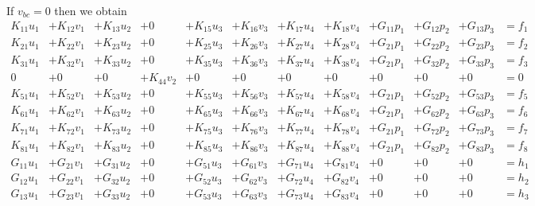 If $v_{bc}=0$ then we obtain
{\small
\[
\begin{array}{lllllllllllll}
K_{11} u_1 &+ K_{12} v_1 &+ K_{13} u_2 &+ 0 &+ K_{15} u_3 &+ K_{16} v_3 &+ K_{17}u_4  &+ K_{18}v_4  
&+ G_{11}p_1 &+ G_{12} p_2 &+ G_{13} p_3 & =  f_1 \\
K_{21} u_1 &+ K_{22} v_1 &+ K_{23} u_2 &+ 0 &+ K_{25} u_3 &+ K_{26} v_3 &+ K_{27}u_4  &+ K_{28}v_4  
&+ G_{21}p_1 &+ G_{22} p_2 &+ G_{23} p_3 & =  f_2 \\
K_{31} u_1 &+ K_{32} v_1 &+ K_{33} u_2 &+ 0 &+ K_{35} u_3 &+ K_{36} v_3 &+ K_{37}u_4  &+ K_{38}v_4  
&+ G_{21}p_1 &+ G_{32} p_2 &+ G_{33} p_3 & =  f_3 \\
0  &+ 0  &+ 0  &+ K_{44} v_2 &+ 0 &+ 0 &+ 0  &+ 0  
&+ 0 &+ 0 &+ 0 & =  0 \\
K_{51} u_1 &+ K_{52} v_1 &+ K_{53} u_2 &+ 0 &+ K_{55} u_3 &+ K_{56} v_3 &+ K_{57}u_4  &+ K_{58}v_4  
&+ G_{21}p_1 &+ G_{52} p_2 &+ G_{53} p_3 & =  f_5 \\
K_{61} u_1 &+ K_{62} v_1 &+ K_{63} u_2 &+ 0 &+ K_{65} u_3 &+ K_{66} v_3 &+ K_{67}u_4  &+ K_{68}v_4  
&+ G_{21}p_1 &+ G_{62} p_2 &+ G_{63} p_3 & =  f_6 \\
K_{71} u_1 &+ K_{72} v_1 &+ K_{73} u_2 &+ 0 &+ K_{75} u_3 &+ K_{76} v_3 &+ K_{77}u_4  &+ K_{78}v_4  
&+ G_{21}p_1 &+ G_{72} p_2 &+ G_{73} p_3 & =  f_7 \\
K_{81} u_1 &+ K_{82} v_1 &+ K_{83} u_2 &+ 0 &+ K_{85} u_3 &+ K_{86} v_3 &+ K_{87}u_4  &+ K_{88}v_4  
&+ G_{21}p_1 &+ G_{82} p_2 &+ G_{83} p_3 & =  f_8 \\
G_{11}u_1 &+ G_{21}v_1 &+ G_{31}u_2 &+ 0 &+ G_{51}u_3 &+ G_{61}v_3 &+ G_{71}u_4 &+ G_{81}v_4 &+0&+0&+0&= h_1 \\
G_{12}u_1 &+ G_{22}v_1 &+ G_{32}u_2 &+ 0 &+ G_{52}u_3 &+ G_{62}v_3 &+ G_{72}u_4 &+ G_{82}v_4 &+0&+0&+0&= h_2 \\
G_{13}u_1 &+ G_{23}v_1 &+ G_{33}u_2 &+ 0 &+ G_{53}u_3 &+ G_{63}v_3 &+ G_{73}u_4 &+ G_{83}v_4 &+0&+0&+0&= h_3 
\end{array}
\]
}




